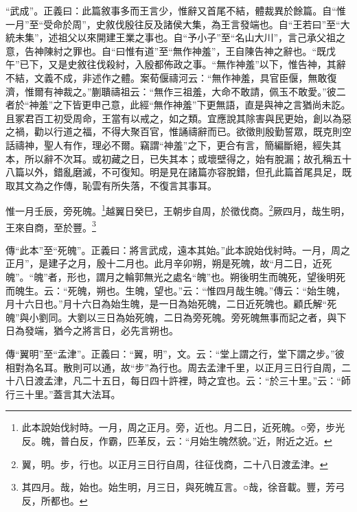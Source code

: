 {\noindent\shu{}\fzkt “武成”。正義曰：此篇敘事多而王言少，惟辭又首尾不結，體裁異於餘篇。自“惟一月”至“受命於周”，史敘伐殷往反及諸侯大集，為王言發端也。自“王若曰”至“大統未集”，述祖父以來開建王業之事也。自“予小子”至“名山大川”，言己承父祖之意，告神陳紂之罪也。自“曰惟有道”至“無作神羞”，王自陳告神之辭也。“既戊午”已下，又是史敘往伐殺紂，入殷都佈政之事。“無作神羞”以下，惟告神，其辭不結，文義不成，非述作之體。案荀偃禱河云：“無作神羞，具官臣偃，無敢復濟，惟爾有神裁之。”蒯聵禱祖云：“無作三祖羞，大命不敢請，佩玉不敢愛。”彼二者於“神羞”之下皆更申己意，此經“無作神羞”下更無語，直是與神之言猶尚未訖。且冢君百工初受周命，王當有以戒之，如之類。宜應說其除害與民更始，創以為惡之禍，勸以行道之福，不得大聚百官，惟誦禱辭而已。欲徵則殷勤誓眾，既克則空話禱神，聖人有作，理必不爾。竊謂“神羞”之下，更合有言，簡編斷絕，經失其本，所以辭不次耳。或初藏之日，已失其本；或壞壁得之，始有脫漏；故孔稱五十八篇以外，錯亂磨滅，不可復知。明是見在諸篇亦容脫錯，但孔此篇首尾具足，既取其文為之作傳，恥雲有所失落，不復言其事耳。 \par}

惟一月壬辰，旁死魄。\footnote{此本說始伐紂時。一月，周之正月。旁，近也。月二日，近死魄。○旁，步光反。魄，普白反，作霸，匹革反，云：“月始生魄然貌。”近，附近之近。}越翼日癸巳，王朝步自周，於徵伐商。\footnote{翼，明。步，行也。以正月三日行自周，往征伐商，二十八日渡孟津。}厥四月，哉生明，王來自商，至於豐。\footnote{其四月。哉，始也。始生明，月三日，與死魄互言。○哉，徐音載。豐，芳弓反，所都也。}


{\noindent\zhuan{}\fzbyks 傳“此本”至“死魄”。正義曰：將言武成，遠本其始。”此本說始伐紂時。一月，周之正月”，是建子之月，殷十二月也。此月辛卯朔，朔是死魄，故“月二日，近死魄”。“魄”者，形也，謂月之輪郭無光之處名“魄”也。朔後明生而魄死，望後明死而魄生。云：“死魄，朔也。生魄，望也。”云：“惟四月哉生魄。”傳云：“始生魄，月十六日也。”月十六日為始生魄，是一日為始死魄，二日近死魄也。顧氏解“死魄”與小劉同。大劉以三日為始死魄，二日為旁死魄。旁死魄無事而記之者，與下日為發端，猶今之將言日，必先言朔也。 \par}

{\noindent\zhuan{}\fzbyks 傳“翼明”至“孟津”。正義曰：“翼，明”，文。云：“堂上謂之行，堂下謂之步。”彼相對為名耳。散則可以通，故“步”為行也。周去孟津千里，以正月三日行自周，二十八日渡孟津，凡二十五日，每日四十許裡，時之宜也。云：“於三十里。”云：“師行三十里。”蓋言其大法耳。 \par}

